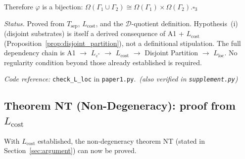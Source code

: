 \documentclass[11pt]{article}
\theoremstyle{remark}
\newcommand{\coderef}[2]{\smallskip\noindent\textit{Code reference:} \texttt{#1} in \texttt{#2}.}
\begin{document}
\begin{tcolorbox}[apfbox, title={Lemma $L_{\mathrm{loc}}$ (Locality)}]
Therefore $\varphi$ is a bijection: $\Omega(\Gamma_1 \cup \Gamma_2) \cong \Omega(\Gamma_1) \times \Omega(\Gamma_2)$.\hfill$\square_3$

\smallskip\noindent\textit{Status.}  Proved from $T_{\mathrm{sep}}$, $L_{\mathrm{cost}}$, and the $\mathcal{D}$-quotient definition.  Hypothesis~(i) (disjoint substrates) is itself a derived consequence of A1 + $L_{\mathrm{cost}}$ (Proposition~\ref{prop:disjoint_partition}), not a definitional stipulation.  The full dependency chain is A1 $\to$ $L_{\varepsilon^*}$ $\to$ $L_{\mathrm{cost}}$ $\to$ Disjoint Partition $\to$ $L_{\mathrm{loc}}$.  No regularity condition beyond those already established is required.

\coderef{check\_L\_loc}{paper1.py}\,%
\hspace{1em}\textit{(also verified in \texttt{supplement.py})}
\end{tcolorbox}


\subsection{Theorem NT (Non-Degeneracy): proof from $L_{\mathrm{cost}}$}
\label{sec:NT_proof}

With $L_{\mathrm{cost}}$ established, the non-degeneracy theorem NT (stated in Section~\ref{sec:argument}) can now be proved.
\end{document}
